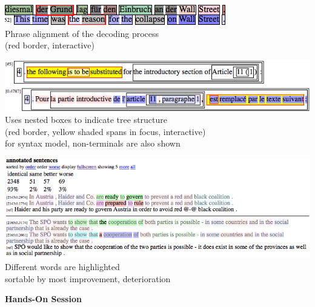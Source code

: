\documentclass[landscape]{uedslides2C}
\begin{document}
\vspace{30mm}
\begin{center}
\includegraphics[scale=1.5]{analysis-alignment.png}\\[10mm]
Phrase alignment of the decoding process\\[5mm]
(red border, interactive)
\end{center}


\vspace{15mm}
\begin{center}
\includegraphics[scale=1.2]{analysis-tree-alignment.png}\\[10mm]
Uses nested boxes to indicate tree structure\\[3mm]
(red border, yellow shaded spans in focus, interactive)\\[3mm]
for syntax model, non-terminals are also shown
\end{center}


\begin{center}
\includegraphics[scale=1]{analysis-comparison.png}\\[10mm]
Different words are highlighted\\[3mm]
sortable by most improvement, deterioration
\end{center}

\slide{}
\vspace{50mm}
\begin{center}
\Huge \bf Hands-On Session
\end{center}
\end{document}
